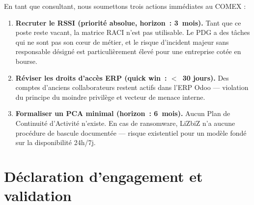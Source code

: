 \documentclass[12pt,a4paper]{article}
\begin{document}
\begin{boxaction}
En tant que consultant, nous soumettons trois actions immédiates au
COMEX :

\begin{enumerate}
    \item \textbf{Recruter le RSSI (priorité absolue, horizon~: 3~mois).}
     Tant que ce poste reste vacant, la matrice RACI n’est pas utilisable.
    Le PDG a des tâches qui ne sont pas son cœur de métier,
    et le risque d’incident majeur sans responsable désigné est
    particulièrement élevé pour une entreprise cotée en bourse.

    \item \textbf{Réviser les droits d'accès ERP (quick win~: $<$~30
    jours).} Des comptes d'anciens collaborateurs restent actifs dans
    l'ERP Odoo --- violation du principe du moindre privilège
     et vecteur de menace interne.

    \item \textbf{Formaliser un PCA minimal (horizon~: 6~mois).}
    Aucun Plan de Continuité d'Activité n'existe. En cas de ransomware,
    LiZbiZ n'a aucune procédure de bascule documentée --- risque
    existentiel pour un modèle fondé sur la disponibilité 24h/7j.
\end{enumerate}
\end{boxaction}

\newpage

\section{Déclaration d'engagement et validation}
\end{document}
